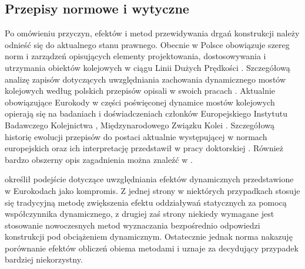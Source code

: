 \subsection{Przepisy normowe i wytyczne}
Po omówieniu przyczyn, efektów i metod przewidywania drgań konstrukcji należy odnieść się do aktualnego stanu prawnego. Obecnie w Polsce obowiązuje szereg norm i zarządzeń opisujących elementy projektowania, dostosowywania i utrzymania obiektów kolejowych w ciągu Linii Dużych Prędkości \parencite{PolskieLinieKolejoweS.A.2005,PolskieLinieKolejoweS.A.2009,PolskiKomitetNormalizacyjny,PolskiKomitetNormalizacyjny2004,PKNj}. Szczegółową analizę zapisów dotyczących uwzględniania zachowania dynamicznego mostów kolejowych według polskich przepisów opisali w swoich pracach \cite{Oleszek2015,Oleszek2015b,Oleszek2016a}. Aktualnie obowiązujące Eurokody w części poświęconej dynamice mostów kolejowych opierają się na badaniach i doświadczeniach członków Europejskiego Instytutu Badawczego Kolejnictwa  \parencite{ERRI1998,Muncke2008}, Międzynarodowego Związku Kolei  \parencite{UnionInternationaleDesCheminsDeFer2006,UnionInternationaleDesCheminsDeFer2009}. Szczegółową historię ewolucji przepisów do postaci aktualnie występującej w normach europejskich oraz ich interpretację przedstawił w pracy doktorskiej \cite{James2003}. Również bardzo obszerny opis zagadnienia można znaleźć w \parencite{Goicolea2002,Dias2007}.

\cite{Karas2011a} określił podejście dotyczące uwzględniania efektów dynamicznych przedstawione w Eurokodach jako kompromis. Z jednej strony w niektórych przypadkach stosuje się tradycyjną metodę zwiększenia efektu oddziaływań statycznych za pomocą współczynnika dynamicznego, z drugiej zaś strony niekiedy wymagane jest stosowanie nowoczesnych metod wyznaczania bezpośrednio odpowiedzi konstrukcji pod obciążeniem dynamicznym. Ostatecznie jednak norma nakazuję porównanie efektów obliczeń obiema metodami i uznaje za decydujący przypadek bardziej niekorzystny. 

